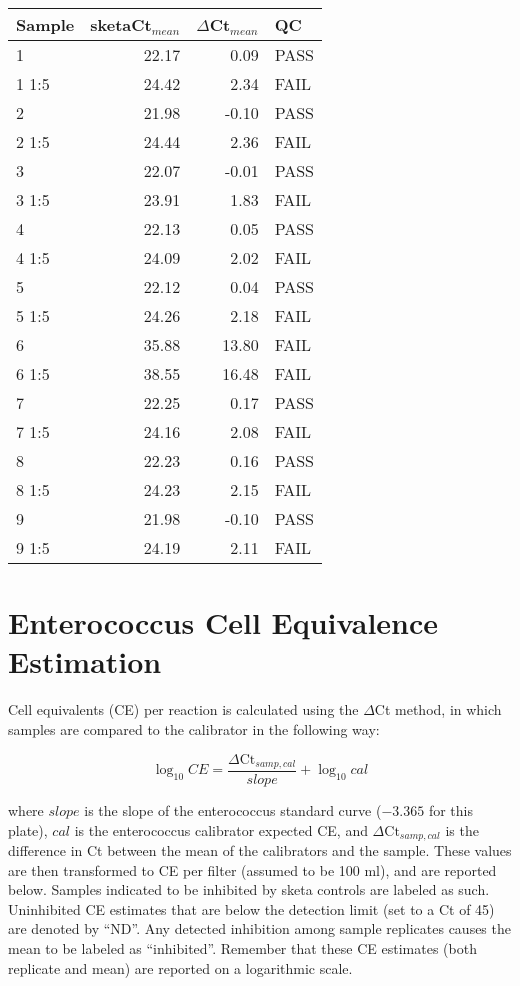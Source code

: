 \documentclass{article}\usepackage[]{graphicx}\usepackage[]{color}
\begin{document}
\begin{table}[ht]
\centering
\begin{tabular}{lrrl}
  \hline
Sample & sketaCt$_{mean}$ & $\Delta$Ct$_{mean}$ & QC \\ 
  \hline
1 & 22.17 & 0.09 & PASS \\ 
  1 1:5 & 24.42 & 2.34 & FAIL \\ 
  2 & 21.98 & -0.10 & PASS \\ 
  2 1:5 & 24.44 & 2.36 & FAIL \\ 
  3 & 22.07 & -0.01 & PASS \\ 
  3 1:5 & 23.91 & 1.83 & FAIL \\ 
  4 & 22.13 & 0.05 & PASS \\ 
  4 1:5 & 24.09 & 2.02 & FAIL \\ 
  5 & 22.12 & 0.04 & PASS \\ 
  5 1:5 & 24.26 & 2.18 & FAIL \\ 
  6 & 35.88 & 13.80 & FAIL \\ 
  6 1:5 & 38.55 & 16.48 & FAIL \\ 
  7 & 22.25 & 0.17 & PASS \\ 
  7 1:5 & 24.16 & 2.08 & FAIL \\ 
  8 & 22.23 & 0.16 & PASS \\ 
  8 1:5 & 24.23 & 2.15 & FAIL \\ 
  9 & 21.98 & -0.10 & PASS \\ 
  9 1:5 & 24.19 & 2.11 & FAIL \\ 
   \hline
\end{tabular}
\end{table}


\pagebreak
\section{Enterococcus Cell Equivalence Estimation}

Cell equivalents (CE) per reaction is calculated using the $\Delta$Ct method, in which samples are compared to the calibrator
in the following way:

$$ \log_{10}{CE} = \frac{\Delta\text{Ct}_{samp, cal}}{slope} + \log_{10}{cal} $$

where $slope$ is the slope of the enterococcus standard curve (\ensuremath{-3.365} for this plate),
$cal$ is the enterococcus calibrator expected CE, and
$\Delta\text{Ct}_{samp, cal}$ is the difference in Ct between the mean of the calibrators and
the sample. These values are then transformed to CE per filter (assumed to be 100 ml), and are reported below.
Samples indicated to be inhibited by sketa controls are labeled as such. Uninhibited CE estimates that are below the detection
limit (set to a Ct of 45) are denoted by ``ND''. Any detected inhibition among sample replicates causes the mean
to be labeled as ``inhibited''. Remember that these CE estimates (both replicate and mean) are reported on a logarithmic scale.
\end{document}
